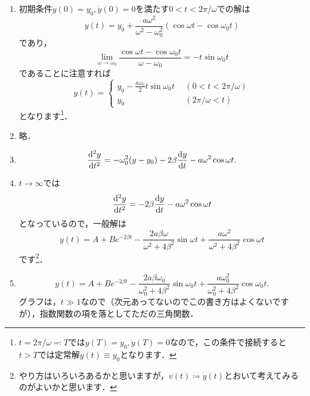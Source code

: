 \documentclass[a4paper,pdflatex,ja=standard]{bxjsarticle}
\begin{document}
\begin{enumerate}
  \item 

  初期条件$y(0)=y_0,\dot{y}(0)=0$を満たす$0<t<2\pi/\omega$での解は
  \begin{equation}
    y(t)
    =
    y_0
    +
    \frac{a\omega^2}{\omega^2-\omega_0^2}
    (\cos\omega t-\cos\omega_0 t)
  \end{equation}
  であり，
  \begin{equation}
    \lim_{\omega\rightarrow\omega_0}
    \frac{\cos\omega t-\cos\omega_0 t}{\omega-\omega_0}
    =
    -t\sin\omega_0 t
  \end{equation}
  であることに注意すれば
  \begin{equation}
    y(t)
    =
    \left\{
      \begin{alignedat}{1}
        y_0
        -
        \frac{a\omega_0}{2}t\sin\omega_0 t
        \ &\ (0<t<2\pi/\omega)
        \\
        y_0
        \ &\ (2\pi/\omega<t)
      \end{alignedat}
    \right.
  \end{equation}
  となります\footnote{
    $t=2\pi/\omega\eqqcolon T$では$y(T)=y_0,\dot{y}(T)=0$なので，この条件で接続すると$t>T$では定常解$y(t)\equiv y_0$となります．
  }．

  \item 

  略．

  \item 

  \begin{equation}
    \dv[2]{y}{t}
    =
    -\omega_0^2(y-y_0)
    -
    2\beta \dv{y}{t}
    -
    a\omega^2\cos\omega t
    .
  \end{equation}

  \item 

  $t\rightarrow\infty$では
  \begin{equation}
    \dv[2]{y}{t}
    =
    -
    2\beta \dv{y}{t}
    -
    a\omega^2\cos\omega t
  \end{equation}
  となっているので，一般解は
  \begin{equation}
    y(t)
    =
    A+Be^{-2\beta t}
    -
    \frac{2a\beta\omega}{\omega^2+4\beta^2}\sin\omega t
    +
    \frac{a\omega^2}{\omega^2+4\beta^2}\cos\omega t 
  \end{equation}
  です\footnote{
    やり方はいろいろあるかと思いますが，$v(t)\coloneqq \dot{y}(t)$とおいて考えてみるのがよいかと思います．
  }．

  \item 

  \begin{equation}
    y(t)
    =
    A+Be^{-2\beta t}
    -
    \frac{2a\beta\omega_0}{\omega_0^2+4\beta^2}\sin\omega_0 t
    +
    \frac{a\omega_0^2}{\omega_0^2+4\beta^2}\cos\omega_0 t 
    .
  \end{equation}
  グラフは，$t\gg 1$なので（次元あってないのでこの書き方はよくないですが），指数関数の項を落としてただの三角関数．

\end{enumerate}
\end{document}
